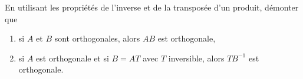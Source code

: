 

\begin{exercice}\label{exoINGE1121La0004}

	En utilisant les propriétés de l'inverse et de la transposée d'un produit, démonter que
	\begin{enumerate}

		\item
			si $A$ et $B$ sont orthogonales, alors $AB$ est orthogonale,
		\item
			si $A$ est orthogonale et si $B=AT$ avec $T$ inversible, alors $TB^{-1}$ est orthogonale.

	\end{enumerate}

\end{exercice}
